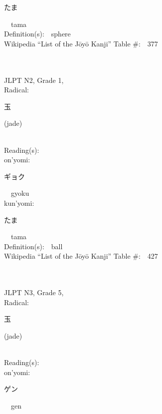 \begin{multicols}{2}
{\hspace*{2em}}{\begin{CJK}{UTF8}{min} たま \end{CJK}}\ \ tama\ \ \\
Definition(s):\ \ sphere \\
Wikipedia ``List of the J\=oy\=o Kanji'' Table \#:\ \ 377 \\
\ \ \\
{\fontsize{34pt}{40pt}  }\ \ \\  %
{JLPT N2, Grade 1, \\Radical:\ \ {\begin{CJK}{UTF8}{min} 玉 \end{CJK}} (jade) } \\
Reading(s):\ \ \\
{\hspace*{1em}}on'yomi:\ \ \\
{\hspace*{2em}}{\begin{CJK}{UTF8}{min} ギョク \end{CJK}}\ \ gyoku\ \ \\
{\hspace*{1em}}kun'yomi:\ \ \\
{\hspace*{2em}}{\begin{CJK}{UTF8}{min} たま \end{CJK}}\ \ tama\ \ \\
Definition(s):\ \ ball \\
Wikipedia ``List of the J\=oy\=o Kanji'' Table \#:\ \ 427 \\
\ \ \\
{\fontsize{34pt}{40pt}  }\ \ \\  %
{JLPT N3, Grade 5, \\Radical:\ \ {\begin{CJK}{UTF8}{min} 玉 \end{CJK}} (jade) } \\
Reading(s):\ \ \\
{\hspace*{1em}}on'yomi:\ \ \\
{\hspace*{2em}}{\begin{CJK}{UTF8}{min} ゲン \end{CJK}}\ \ gen\ \ \\

\end{multicols}
